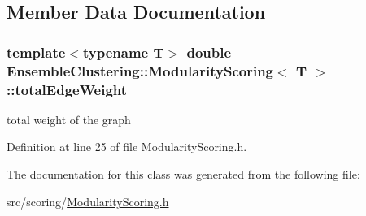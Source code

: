 \subsection{Member Data Documentation}
\hypertarget{class_ensemble_clustering_1_1_modularity_scoring_adb7d45c3830ff06335256898bbbaaf7c}{
\subsubsection[{total\-Edge\-Weight}]{\setlength{\rightskip}{0pt plus 5cm}template$<$typename T$>$ double {\bf Ensemble\-Clustering\-::\-Modularity\-Scoring}$<$ T $>$\-::total\-Edge\-Weight\hspace{0.3cm}{\ttfamily [protected]}}}\label{class_ensemble_clustering_1_1_modularity_scoring_adb7d45c3830ff06335256898bbbaaf7c}


total weight of the graph 



Definition at line 25 of file Modularity\-Scoring.\-h.



The documentation for this class was generated from the following file\-:\begin{DoxyCompactItemize}
\item 
src/scoring/\hyperlink{_modularity_scoring_8h}{Modularity\-Scoring.\-h}\end{DoxyCompactItemize}
